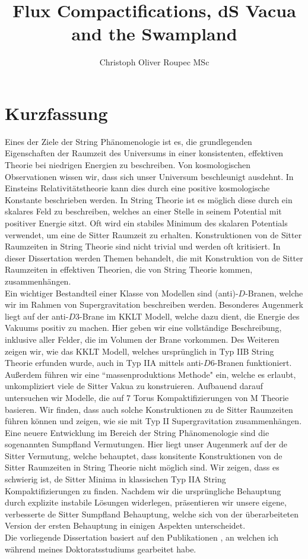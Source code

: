 \documentclass[12pt]{report}
\title{Flux Compactifications, dS Vacua and the Swampland}
\author{Christoph Oliver Roupec MSc}
\begin{document}
\section*{Kurzfassung}
Eines der Ziele der String Phänomenologie ist es, die grundlegenden Eigenschaften der Raumzeit des Universums in einer konsistenten, effektiven Theorie bei niedrigen Energien zu beschreiben. Von kosmologischen Observationen wissen wir, dass sich unser Universum beschleunigt ausdehnt. In Einsteins Relativitätstheorie kann dies durch eine positive kosmologische Konstante beschrieben werden. In String Theorie ist es möglich diese durch ein skalares Feld zu beschreiben, welches an einer Stelle in seinem Potential mit positiver Energie sitzt. Oft wird ein stabiles Minimum des skalaren Potentials verwendet, um eine de Sitter Raumzeit zu erhalten. Konstruktionen von de Sitter Raumzeiten in String Theorie sind nicht trivial und werden oft kritisiert. In dieser Dissertation werden Themen behandelt, die mit Konstruktion von de Sitter Raumzeiten in effektiven Theorien, die von String Theorie kommen, zusammenhängen.\\
Ein wichtiger Bestandteil einer Klasse von Modellen sind (anti)-$D$-Branen, welche wir im Rahmen von Supergravitation beschreiben werden. Besonderes Augenmerk liegt auf der anti-$D3$-Brane im KKLT Modell, welche dazu dient, die Energie des Vakuums positiv zu machen. Hier geben wir eine vollständige Beschreibung, inklusive aller Felder, die im Volumen der Brane vorkommen. Des Weiteren zeigen wir, wie das KKLT Modell, welches ursprünglich in Typ IIB String Theorie erfunden wurde, auch in Typ IIA mittels anti-$D6$-Branen funktioniert. Außerdem führen wir eine ``massenproduktions Methode" ein, welche es erlaubt, unkompliziert viele de Sitter Vakua zu konstruieren. Aufbauend darauf untersuchen wir Modelle, die auf 7 Torus Kompaktifizierungen von M Theorie basieren. Wir finden, dass auch solche Konstruktionen zu de Sitter Raumzeiten führen können und zeigen, wie sie mit Typ II Supergravitation zusammenhängen.\\
Eine neuere Entwicklung im Bereich der String Phänomenologie sind die sogenannten Sumpfland Vermutungen. Hier liegt unser Augenmerk auf der de Sitter Vermutung, welche behauptet, dass konsitente Konstruktionen von de Sitter Raumzeiten in String Theorie nicht möglich sind. Wir zeigen, dass es schwierig ist, de Sitter Minima in klassischen Typ IIA String Kompaktifizierungen zu finden. Nachdem wir die ursprüngliche Behauptung durch explizite instabile Lösungen widerlegen, präsentieren wir unsere eigene, verbesserte de Sitter Sumpfland Behauptung, welche sich von der überarbeiteten Version der ersten Behauptung in einigen Aspekten unterscheidet.\vspace{12pt}\\
Die vorliegende Dissertation basiert auf den Publikationen \cite{Roupec:2018mbn,Banlaki:2018ayh,Andriot:2018mav,Cribiori:2019hod,Cribiori:2019bfx,Cribiori:2019drf,Cribiori:2019hrb,Cribiori:2020bgt}, an welchen ich während meines Doktoratsstudiums gearbeitet habe.
\end{document}
